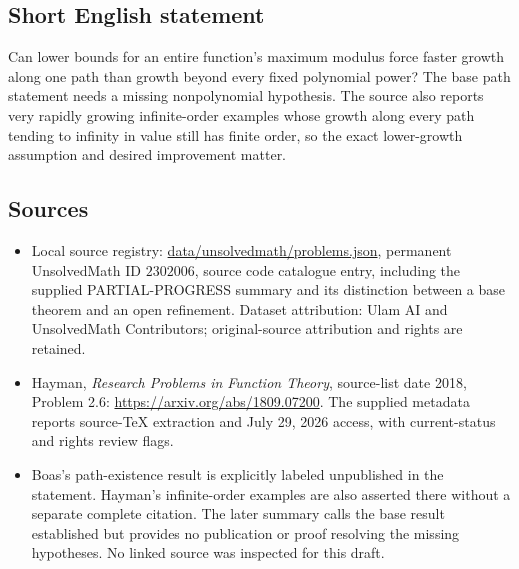 \documentclass[11pt]{article}
\begin{document}
\subsection{Short English statement}
Can lower bounds for an entire function's maximum modulus force faster growth along one path than growth beyond every fixed polynomial power? The base path statement needs a missing nonpolynomial hypothesis. The source also reports very rapidly growing infinite-order examples whose growth along every path tending to infinity in value still has finite order, so the exact lower-growth assumption and desired improvement matter.
\subsection{Sources}
\begin{itemize}
\item Local source registry: \url{data/unsolvedmath/problems.json}, permanent UnsolvedMath ID $2302006$, source code catalogue entry, including the supplied PARTIAL-PROGRESS summary and its distinction between a base theorem and an open refinement. Dataset attribution: Ulam AI and UnsolvedMath Contributors; original-source attribution and rights are retained.
\item Hayman, \emph{Research Problems in Function Theory}, source-list date 2018, Problem 2.6: \url{https://arxiv.org/abs/1809.07200}. The supplied metadata reports source-TeX extraction and July 29, 2026 access, with current-status and rights review flags.
\item Boas's path-existence result is explicitly labeled unpublished in the statement. Hayman's infinite-order examples are also asserted there without a separate complete citation. The later summary calls the base result established but provides no publication or proof resolving the missing hypotheses. No linked source was inspected for this draft.
\end{itemize}
\end{document}
